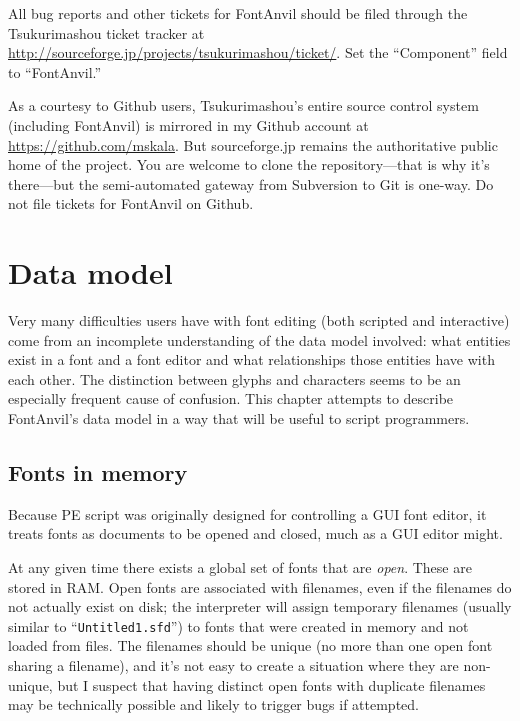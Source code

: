 \documentclass[11pt]{report}
\begin{document}
All bug reports and other tickets for FontAnvil should be filed through
the Tsukurimashou ticket tracker at
\url{http://sourceforge.jp/projects/tsukurimashou/ticket/}.  Set the
``Component'' field to ``FontAnvil.''

As a courtesy to Github users, Tsukurimashou's entire source control system
(including FontAnvil) is mirrored in my Github account at
\url{https://github.com/mskala}.  But sourceforge.jp remains the
authoritative public home of the project.  You are welcome to clone the
repository---that is why it's there---but the semi-automated gateway from
Subversion to Git is one-way.  Do not file tickets for FontAnvil on Github.

\clearpage


\chapter{Data model}
\label{sec:data-model}

Very many difficulties users have with font editing (both scripted and
interactive) come from an incomplete understanding of the data model
involved: what entities exist in a font and a font editor and what
relationships those entities have with each other.  The distinction between
glyphs and characters seems to be an especially frequent cause of confusion. 
This chapter attempts to describe FontAnvil's data model in a way that will
be useful to script programmers.

\section{Fonts in memory}

Because PE script was originally designed for controlling a GUI font
editor, it treats fonts as documents to be opened and closed, much as
a GUI editor might.

At any given time there exists a global set of fonts that are \emph{open}. 
These are stored in RAM.  Open fonts are associated with filenames, even if
the filenames do not actually exist on disk; the interpreter will assign
temporary filenames (usually similar to ``\texttt{Untitled1.sfd}'') to fonts
that were created in memory and not loaded from files.  The filenames should
be unique (no more than one open font sharing a filename), and it's not easy
to create a situation where they are non-unique, but I suspect that having
distinct open fonts with duplicate filenames may be technically possible and
likely to trigger bugs if attempted.
\end{document}
